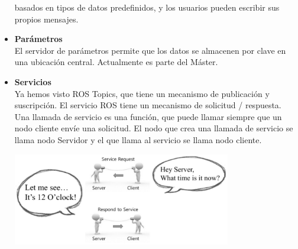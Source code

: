 \begin{itemize}
	      basados en tipos de datos predefinidos, y los usuarios pueden escribir sus
	      propios mensajes.
	\item \textbf{Parámetros}\\
	      El servidor de parámetros permite que los datos se almacenen por clave en una
	      ubicación central. Actualmente es parte del Máster.
	\item \textbf{Servicios}\\
	      Ya hemos visto ROS Topics, que tiene un mecanismo de publicación y suscripción.
	      El servicio ROS tiene un mecanismo de solicitud / respuesta. Una llamada de
	      servicio es una función, que puede llamar siempre que un nodo cliente envíe una
	      solicitud. El nodo que crea una llamada de servicio se llama nodo Servidor y el
	      que llama al servicio se llama nodo cliente.\cite{Book:Lentin2018}
	      \begin{center}
		      \includegraphics[width=0.75\textwidth]{Contenido/Cuerpo/Capitulo2/Fig4.eps}
		      \label{fig:MarcoTeorico:Fig16}
	      \end{center}

\end{itemize}

